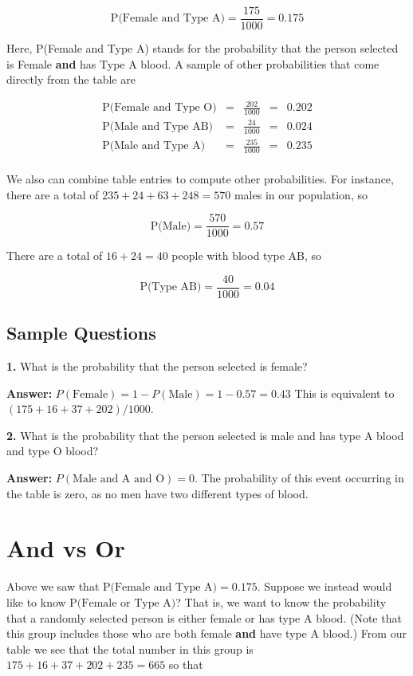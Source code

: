 \documentclass[
]{book}
\begin{document}
\[\mbox{P(Female and Type A)} = \frac{175}{1000} = 0.175\]

Here, P(Female and Type A) stands for the probability that the person selected is Female \textbf{and} has Type A blood.
A sample of other probabilities that come directly from the table are

\[
\begin{array}{rcccl}
\mbox{P(Female and Type O)} & = & {\displaystyle\frac{202}{1000}} & = & 0.202 \\[5pt]
\mbox{P(Male and Type AB)} & = & {\displaystyle\frac{24}{1000}} & = & 0.024 \\[5pt]
\mbox{P(Male and Type A)} & = & {\displaystyle\frac{235}{1000}} & = & 0.235 \\
\end{array}
\]

We also can combine table entries to compute other probabilities.
For instance, there are a total of \(235 + 24 + 63 + 248 = 570\) males in our population, so

\[
\mbox{P(Male)} = \frac{570}{1000} = 0.57
\]

There are a total of \(16 + 24 = 40\) people with blood type AB, so

\[
\mbox{P(Type AB)} = \frac{40}{1000} = 0.04
\]

\hypertarget{sample-questions}{%
\subsection{Sample Questions}\label{sample-questions}}

\textbf{1.} What is the probability that the person selected is female?

\textbf{Answer:} \(P(\text{Female}) = 1 - P(\text{Male}) = 1 - 0.57 = 0.43\) This is equivalent to \((175 + 16 + 37 + 202) / 1000\).

\textbf{2.} What is the probability that the person selected is male and has type A blood and type O blood?

\textbf{Answer:} \(P(\text{Male and A and O}) = 0\).
The probability of this event occurring in the table is zero, as no men have two different types of blood.

\hypertarget{and-vs-or}{%
\section{And vs Or}\label{and-vs-or}}

Above we saw that \(\mbox{P(Female and Type A)} = 0.175\). Suppose we instead would like to know \(\mbox{P(Female or Type A)}\)?
That is, we want to know the probability that a randomly selected person is either female or has type A blood.
(Note that this group includes those who are both female \textbf{and} have type A blood.)
From our table we see that the total number in this group is \(175+16+37+202+235 = 665\) so that
\end{document}
